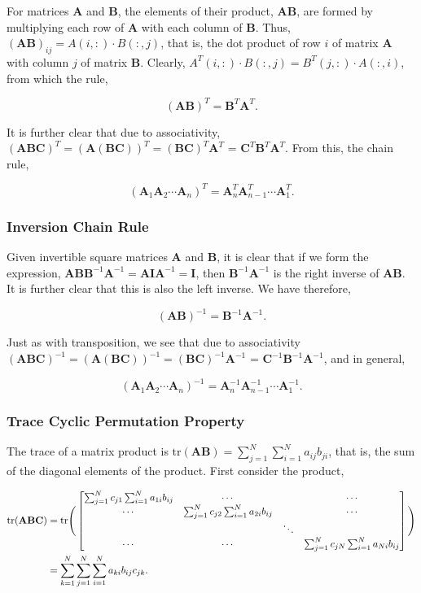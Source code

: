 \documentclass[11pt]{amsart}
\begin{document}
For matrices \textbf{A} and \textbf{B}, the elements of their product, \textbf{AB}, are formed by multiplying each row of \textbf{A} with each column of \textbf{B}. Thus, $(\textbf{AB})_{ij} = A(i, :) \cdot B(:, j)$, that is, the dot product of row $i$ of matrix \textbf{A} with column $j$ of matrix \textbf{B}. Clearly, $A^T(i, :) \cdot B(:, j)= B^T(j, :) \cdot A(:,i)$, from which the rule,

$$(\mathbf{AB})^T = \mathbf{B}^T\mathbf{A}^T.$$

It is further clear that due to associativity, $(\mathbf{ABC})^T = (\mathbf{A(BC)})^T = (\mathbf{BC})^T\mathbf{A}^T$ = $\mathbf{C}^T\mathbf{B}^T\mathbf{A}^T$. From this, the chain rule,

$$(\mathbf{A}_1\mathbf{A}_2\cdots \mathbf{A}_n)^T = \mathbf{A}_n^T\mathbf{A}_{n-1}^T\cdots\mathbf{A}_1^T.$$

\subsubsection{Inversion Chain Rule}

Given invertible square matrices \textbf{A} and \textbf{B}, it is clear that if we form the expression, $\mathbf{AB}\mathbf{B}^{-1}\mathbf{A}^{-1} = \mathbf{A}\mathbf{I}\mathbf{A}^{-1} = \mathbf{I}$, then $\mathbf{B}^{-1}\mathbf{A}^{-1}$ is the right inverse of $\mathbf{AB}$. It is further clear that this is also the left inverse. We have therefore,

$$(\mathbf{AB})^{-1} = \mathbf{B}^{-1}\mathbf{A}^{-1}.$$

Just as with transposition, we see that due to associativity $(\mathbf{ABC})^{-1} = (\mathbf{A(BC)})^{-1} = (\mathbf{BC})^{-1}\mathbf{A}^{-1}$ = $\mathbf{C}^{-1}\mathbf{B}^{-1}\mathbf{A}^{-1}$, and in general,

$$(\mathbf{A}_1\mathbf{A}_2\cdots \mathbf{A}_n)^{-1} = \mathbf{A}_n^{-1}\mathbf{A}_{n-1}^{-1}\cdots\mathbf{A}_1^{-1}.$$

\subsubsection{Trace Cyclic Permutation Property}

The trace of a matrix product is $\text{tr}(\mathbf{A}\mathbf{B}) = \sum_{j=1}^N\sum_{i = 1}^N a_{ij}b_{ji}$, that is, the sum of the diagonal elements of the product. First consider the product,

\begin{align}
\text{tr}(\mathbf{A}\mathbf{B}\mathbf{C}) &= \text{tr}\Bigg(\begin{bmatrix}
\sum_{j=1}^N c_{j1}\sum_{i=1}^Na_{1i}b_{ij} & \cdots & & \cdots \\
\cdots & \sum_{j=1}^N c_{j2}\sum_{i=1}^Na_{2i}b_{ij} & & \cdots \\
 &  & \ddots & \\
\cdots & \cdots &&  \sum_{j=1}^N c_{jN}\sum_{i=1}^Na_{Ni}b_{ij} \\
\end{bmatrix}\Bigg) \notag \\
&= \sum_{k=1}^N\sum_{j=1}^N\sum_{i=1}^Na_{ki}b_{ij}c_{jk}. \notag
\end{align}
\end{document}
